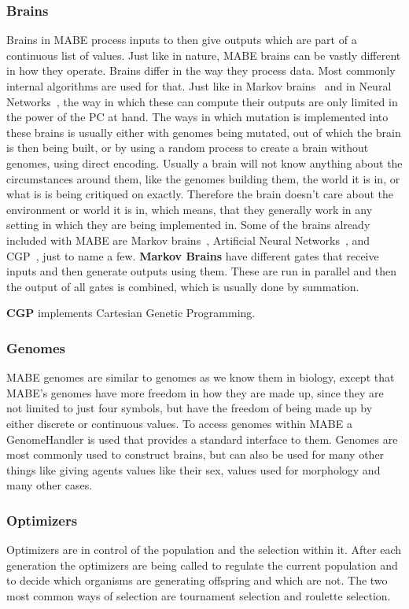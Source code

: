 \documentclass[12pt,oneside,listof=totoc,paper=a4,headings=small]{scrbook}
\begin{document}
\subsubsection{Brains}
Brains in MABE process inputs to then give outputs which are part of a continuous list of values. Just like in nature, MABE brains can be vastly different in how they operate. Brains differ in the way they process data. Most commonly internal algorithms are used for that. Just like in Markov brains~\cite{hintze2017markov} and in Neural Networks~\cite{russell1995modern}, the way in which these can compute their outputs are only limited in the power of the PC at hand. The ways in which mutation is implemented into these brains is usually either with genomes being mutated, out of which the brain is then being built, or by using a random process to create a brain without genomes, using direct encoding. %
Usually a brain will not know anything about the circumstances around them, like the genomes building them, the world it is in, or what is is being critiqued on exactly. Therefore the brain doesn't care about the environment or world it is in, which means, that they generally work in any setting in which they are being implemented in. %
Some of the brains already included with MABE are Markov brains~\cite{hintze2017markov}, Artificial Neural Networks~\cite{russell1995modern}, and CGP~\cite{miller2008cartesian}, just to name a few. 
\newpage
\textbf{Markov Brains} have different gates that receive inputs and then generate outputs using them. These are run in parallel and then the output of all gates is combined, which is usually done by summation.

\textbf{CGP} implements Cartesian Genetic Programming.

\subsubsection{Genomes}
MABE genomes are similar to genomes as we know them in biology, except that MABE's genomes have more freedom in how they are made up, since they are not limited to just four symbols, but have the freedom of being made up by either discrete or continuous values. To access genomes within MABE a GenomeHandler is used that provides a standard interface to them. Genomes are most commonly used to construct brains, but can also be used for many other things like giving agents values like their sex, values used for morphology and many other cases. 

\subsubsection{Optimizers}
Optimizers are in control of the population and the selection within it. After each generation the optimizers are being called to regulate the current population and to decide which organisms are generating offspring and which are not.
The two most common ways of selection are tournament selection and roulette selection.
\end{document}
